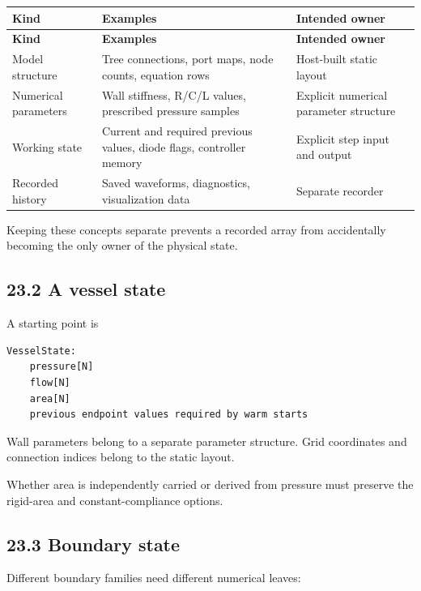 \documentclass[11pt,a4paper]{article}
\begin{document}
\begingroup\footnotesize
\setlength{\tabcolsep}{4pt}
\begin{longtable}{>{\raggedright\arraybackslash}p{}>{\raggedright\arraybackslash}p{}>{\raggedright\arraybackslash}p{}}
\toprule
\textbf{Kind} & \textbf{Examples} & \textbf{Intended owner} \\
\midrule
\endfirsthead
\textbf{Kind} & \textbf{Examples} & \textbf{Intended owner} \\
\midrule
\endhead
\bottomrule
\endfoot
Model structure & Tree connections, port maps, node counts, equation rows & Host-built static layout \\
Numerical parameters & Wall stiffness, R/C/L values, prescribed pressure samples & Explicit numerical parameter structure \\
Working state & Current and required previous values, diode flags, controller memory & Explicit step input and output \\
Recorded history & Saved waveforms, diagnostics, visualization data & Separate recorder \\
\end{longtable}
\endgroup
Keeping these concepts separate prevents a recorded array from accidentally becoming the only owner of the physical state.

\subsection{23.2 A vessel state}
A starting point is


\begin{lstlisting}
VesselState:
    pressure[N]
    flow[N]
    area[N]
    previous endpoint values required by warm starts
\end{lstlisting}
Wall parameters belong to a separate parameter structure. Grid coordinates and connection indices belong to the static layout.

Whether area is independently carried or derived from pressure must preserve the rigid-area and constant-compliance options.

\subsection{23.3 Boundary state}
Different boundary families need different numerical leaves:
\end{document}
